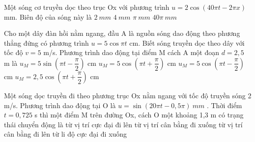 \begin{ex}%
Một sóng cơ truyền dọc theo trục Ox với phương trình $u = 2\cos(40\pi t - 2\pi x)$ mm. Biên độ của sóng này là
\choice
{\True $2\ mm$}
{$4\ mm$}
{$\pi\ mm$}
{$40\pi\ mm$}
\end{ex} 
\begin{ex}%
Cho một dây đàn hồi nằm ngang, đầu A là nguồn sóng dao động theo phương thẳng đứng có phương trình $u=5\cos\pi t$ cm. Biết sóng truyền dọc theo dây với tốc độ $v=5$ m/s. Phương trình dao động tại điểm M cách A một đoạn $d=2,5$ m là
\choice
{$u_M =5\sin(\pi t -\dfrac{\pi}{2})$ cm}
{$u_M=5\cos(\pi t + \dfrac{\pi}{2})$ cm}
{\True $u_M=5\cos(\pi t - \dfrac{\pi}{2})$ cm}
{$u_M=2,5\cos(\pi t + \dfrac{\pi}{2})$ cm}

\end{ex} 
\begin{ex}%
Một sóng dọc truyền đi theo phương trục Ox nằm ngang với tốc độ truyền sóng 2 m/s. Phương trình dao động tại O là $u=\sin \left( 20\pi t-0,5\pi \right)\ mm$ . Thời điểm $t = 0,725$ s thì một điểm M trên đường Ox, cách O một khoảng 1,3 m có trạng thái chuyển động là
\choice
{từ vị trí cực đại đi lên}
{\True từ vị trí cân bằng đi xuống}
{từ vị trí cân bằng đi lên}
{từ li độ cực đại đi xuống}
\end{ex} 
